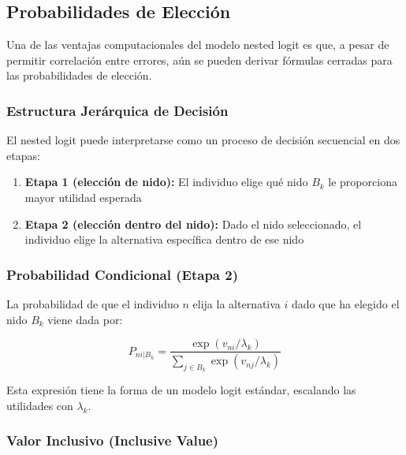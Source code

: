\documentclass[
]{book}
\providecommand{\tightlist}{%
  \setlength{\itemsep}{0pt}\setlength{\parskip}{0pt}}
\begin{document}
\subsection{Probabilidades de Elección}\label{probabilidades-de-elecciuxf3n}

Una de las ventajas computacionales del modelo nested logit es que, a pesar de permitir correlación entre errores, aún se pueden derivar fórmulas cerradas para las probabilidades de elección.

\subsubsection{Estructura Jerárquica de Decisión}\label{estructura-jeruxe1rquica-de-decisiuxf3n}

El nested logit puede interpretarse como un proceso de decisión secuencial en dos etapas:

\begin{enumerate}
\def\labelenumi{\arabic{enumi}.}
\tightlist
\item
  \textbf{Etapa 1 (elección de nido):} El individuo elige qué nido \(B_k\) le proporciona mayor utilidad esperada
\item
  \textbf{Etapa 2 (elección dentro del nido):} Dado el nido seleccionado, el individuo elige la alternativa específica dentro de ese nido
\end{enumerate}

\subsubsection{Probabilidad Condicional (Etapa 2)}\label{probabilidad-condicional-etapa-2}

La probabilidad de que el individuo \(n\) elija la alternativa \(i\) dado que ha elegido el nido \(B_k\) viene dada por:

\begin{equation}
P_{ni|B_k} = \frac{\exp(v_{ni}/\lambda_k)}{\sum_{j \in B_k} \exp(v_{nj}/\lambda_k)}
\label{eq:condprob}
\end{equation}

Esta expresión tiene la forma de un modelo logit estándar, escalando las utilidades con \(\lambda_k\).

\subsubsection{Valor Inclusivo (Inclusive Value)}\label{valor-inclusivo-inclusive-value}
\end{document}
